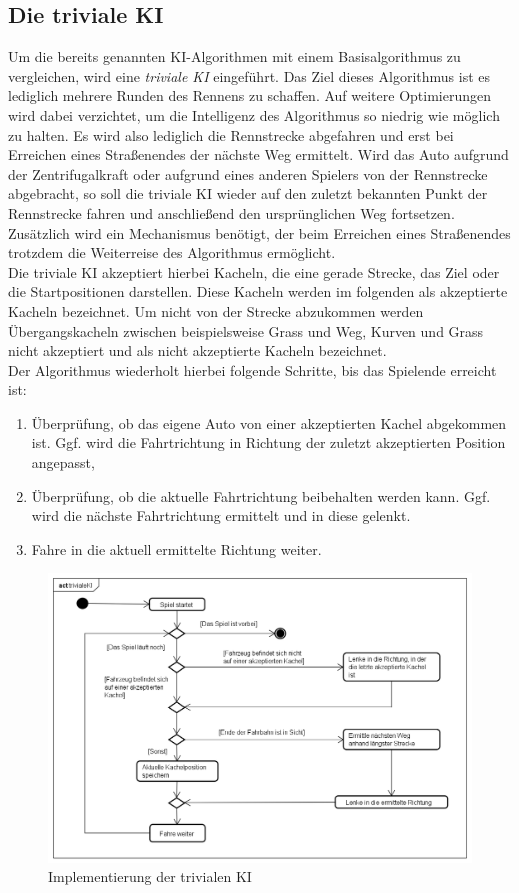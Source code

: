\subsection{Die triviale KI}
Um die bereits genannten KI-Algorithmen mit einem Basisalgorithmus zu vergleichen, wird eine \textit{triviale KI} eingeführt. Das Ziel dieses Algorithmus ist es lediglich mehrere Runden des Rennens zu schaffen. Auf weitere Optimierungen wird dabei verzichtet, um die Intelligenz des Algorithmus so niedrig wie möglich zu halten. Es wird also lediglich die Rennstrecke abgefahren und erst bei Erreichen eines Straßenendes der nächste Weg ermittelt. Wird das Auto aufgrund der Zentrifugalkraft oder aufgrund eines anderen Spielers von der Rennstrecke abgebracht, so soll die triviale KI wieder auf den zuletzt bekannten Punkt der Rennstrecke fahren und anschließend den ursprünglichen Weg fortsetzen. Zusätzlich wird ein Mechanismus benötigt, der beim Erreichen eines Straßenendes trotzdem die Weiterreise des Algorithmus ermöglicht.\\
Die triviale KI akzeptiert hierbei Kacheln, die eine gerade Strecke, das Ziel oder die Startpositionen darstellen. Diese Kacheln werden im folgenden als akzeptierte Kacheln bezeichnet. Um nicht von der Strecke abzukommen werden Übergangskacheln zwischen beispielsweise Grass und Weg, Kurven und Grass nicht akzeptiert und als nicht akzeptierte Kacheln bezeichnet.\\
Der Algorithmus wiederholt hierbei folgende Schritte, bis das Spielende erreicht ist:
\begin{enumerate}
	\item Überprüfung, ob das eigene Auto von einer akzeptierten Kachel abgekommen ist. Ggf. wird die Fahrtrichtung in Richtung der zuletzt akzeptierten Position angepasst,
	\item Überprüfung, ob die aktuelle Fahrtrichtung beibehalten werden kann. Ggf. wird die nächste Fahrtrichtung ermittelt und in diese gelenkt.
	\item Fahre in die aktuell ermittelte Richtung weiter. 
\end{enumerate}

\begin{figure} [h]
\centering
\includegraphics[scale=0.5]{pics/aktivitaet_trivialeKI.png}
\caption{Implementierung der trivialen KI}
\label{fig:trivialeKI}
\end{figure}

